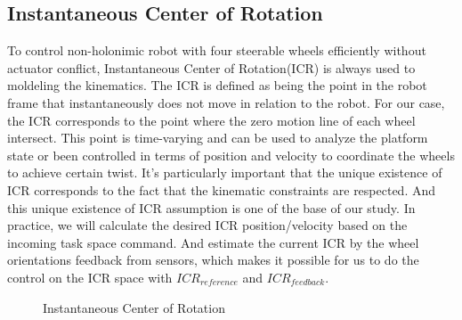 \subsection{Instantaneous Center of Rotation}
\label{sec:Instantaneous Center of Rotation}
To control non-holonimic robot with four steerable wheels efficiently without actuator conflict, Instantaneous Center of Rotation(ICR) is always used to moldeling the kinematics\cite{campion1996structural}\cite{sorour2019complementary}. The ICR is defined as being the point in the robot frame that instantaneously does not move in relation to the robot. For our case, the ICR corresponds to the point where the zero motion line of each wheel intersect. This point is time-varying and can be used to analyze the platform state or been controlled in terms of position and velocity to coordinate the wheels to achieve certain twist. 
It's particularly important that the unique existence of ICR corresponds to the fact that the kinematic constraints are respected. And this unique existence of ICR assumption is one of the base of our study.
In practice, we will calculate the desired ICR position/velocity based on the incoming task space command. And estimate the current ICR by the wheel orientations feedback from sensors, which makes it possible for us to do the control on the ICR space with $ICR_{reference}$ and $ICR_{feedback}$. 

\begin{figure}[H]
	\begin{center}
	\resizebox{10cm}{!}
    {
		}
	\end{center}
	\caption{Instantaneous Center of Rotation}
\end{figure}


